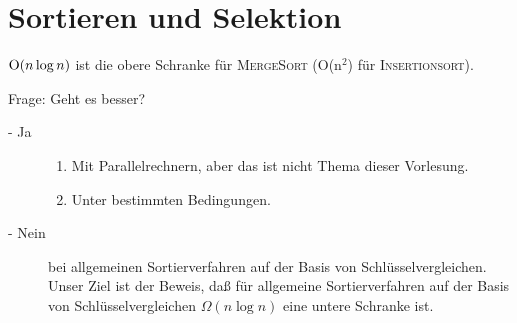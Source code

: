 %
%
%
%
%
%
\chapter{Sortieren und Selektion}

\( \textup{O}(n\log n) \) ist die obere Schranke für \textsc{MergeSort} (O(n$^2$) für \textsc{Insertionsort}).

Frage: Geht es besser? 
\begin{description}
	\item[- Ja]
		\begin{enumerate}
			\item Mit Parallelrechnern, aber das ist nicht Thema dieser Vorlesung.
			\item Unter bestimmten Bedingungen.
		\end{enumerate}
	\item[- Nein]
		bei allgemeinen Sortierverfahren auf der Basis von Schlüsselvergleichen. Unser Ziel ist der Beweis, daß für  
		allgemeine Sortierverfahren auf der Basis von Schlüsselvergleichen \( \Omega(n\log n)\) eine untere Schranke ist.
\end{description} 

